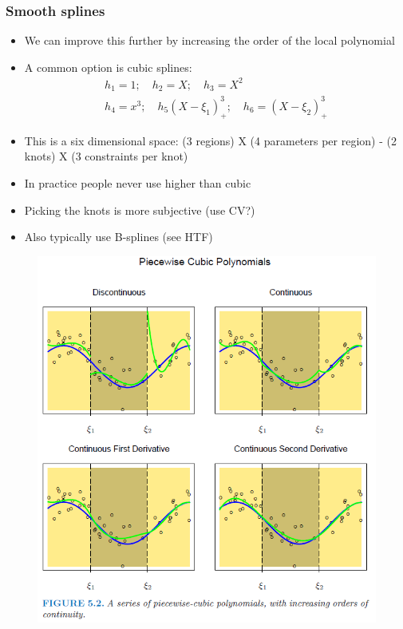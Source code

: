 \begin{frame}
  \frametitle{Smooth splines}
  \begin{itemize}
    \item We can improve this further by increasing the order of the local polynomial
    \item A common option is cubic splines: 
    \begin{eqnarray*}
      h_1 = 1  ; \quad  h_2 = X  ; \quad h_3 = X^2 \\
      h_4 = x^ 3  ; \quad h_5 (X- \xi_1)_+^3 ; \quad h_6 = (X - \xi_2)_+^3 
    \end{eqnarray*} 
    \item This is a six dimensional space: (3 regions) X (4 parameters per region) - (2 knots) X (3 constraints per knot)
    \item In practice people never use higher than cubic
    \item Picking the knots is more subjective (use CV?)
    \item Also typically use B-splines (see HTF)
  \end{itemize}

 \end{frame}

 
\begin{frame}
  \begin{figure}[htbp]
  \begin{center}
  \includegraphics[height=\textheight]{./resources/ESLPiecewiseCubic}
  \end{center}
  \end{figure}
\end{frame}

